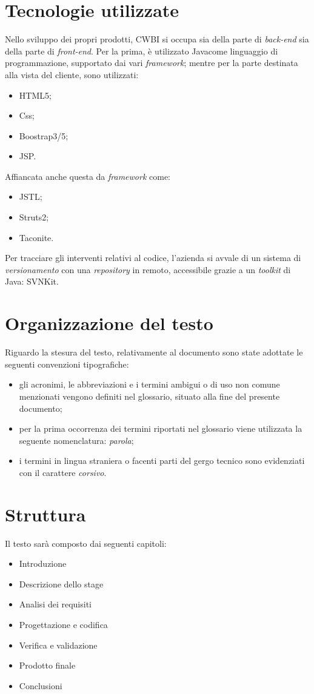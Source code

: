 \section{Tecnologie utilizzate}
Nello sviluppo dei propri prodotti, CWBI si occupa sia della parte di \textit{back-end\glsfirstoccur\;} sia della parte di \textit{front-end\glsfirstoccur\;}.
Per la prima, è utilizzato Java\glsfirstoccur come linguaggio di programmazione, supportato dai vari \textit{framework\glsfirstoccur}; mentre per la parte destinata alla vista del cliente, sono utilizzati:
\begin{itemize}
\item HTML5\glsfirstoccur ;
\item Css\glsfirstoccur ;
\item Boostrap3/5\glsfirstoccur ;
\item JSP\glsfirstoccur .
\end{itemize}
Affiancata anche questa da \textit{framework} come: 
\begin{itemize}
\item JSTL\glsfirstoccur ;
\item Struts2\glsfirstoccur ;
\item Taconite\glsfirstoccur .
\end{itemize}
Per tracciare gli interventi relativi al codice, l'azienda si avvale di un sistema di \textit{versionamento\glsfirstoccur}\; con una \textit{repository\glsfirstoccur}\; in remoto, accessibile grazie a un \textit{toolkit} di Java: SVNKit\glsfirstoccur.

\section{Organizzazione del testo}
Riguardo la stesura del testo, relativamente al documento sono state adottate le seguenti convenzioni tipografiche:
\begin{itemize}
	\item gli acronimi, le abbreviazioni e i termini ambigui o di uso non comune menzionati vengono definiti nel glossario, situato alla fine del presente documento;
	\item per la prima occorrenza dei termini riportati nel glossario viene utilizzata la seguente nomenclatura: \emph{parola}\glsfirstoccur ;
	\item i termini in lingua straniera o facenti parti del gergo tecnico sono evidenziati con il carattere \emph{corsivo}.
\end{itemize}

\section{Struttura}
Il testo sarà composto dai seguenti capitoli:
\begin{itemize}
\item Introduzione
\item Descrizione dello stage
\item Analisi dei requisiti
\item Progettazione e codifica
\item Verifica e validazione
\item Prodotto finale
\item Conclusioni
\end{itemize}